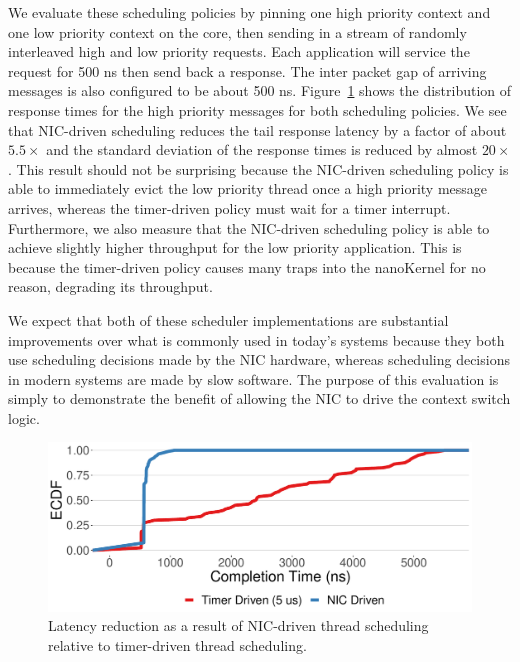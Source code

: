 We evaluate these scheduling policies by pinning one high priority context and one low priority context on the core, then sending in a stream of randomly interleaved high and low priority requests.
Each application will service the request for 500 ns then send back a response.
The inter packet gap of arriving messages is also configured to be about 500 ns.
Figure~\ref{fig:scheduling-latency} shows the distribution of response times for the high priority messages for both scheduling policies.
We see that NIC-driven scheduling reduces the tail response latency by a factor of about $5.5\times$ and the standard deviation of the response times is reduced by almost $20\times$.
This result should not be surprising because the NIC-driven scheduling policy is able to immediately evict the low priority thread once a high priority message arrives, whereas the timer-driven policy must wait for a timer interrupt.
Furthermore, we also measure that the NIC-driven scheduling policy is able to achieve slightly higher throughput for the low priority application.
This is because the timer-driven policy causes many traps into the nanoKernel for no reason, degrading its throughput.

We expect that both of these scheduler implementations are substantial improvements over what is commonly used in today's systems because they both use scheduling decisions made by the NIC hardware, whereas scheduling decisions in modern systems are made by slow software.
The purpose of this evaluation is simply to demonstrate the benefit of allowing the NIC to drive the context switch logic.

\begin{figure}
  \includegraphics[width=\linewidth]{./figures/scheduling-comptimes}
  \caption{Latency reduction as a result of NIC-driven thread scheduling relative to timer-driven thread scheduling.}
  \label{fig:scheduling-latency}
\end{figure}


